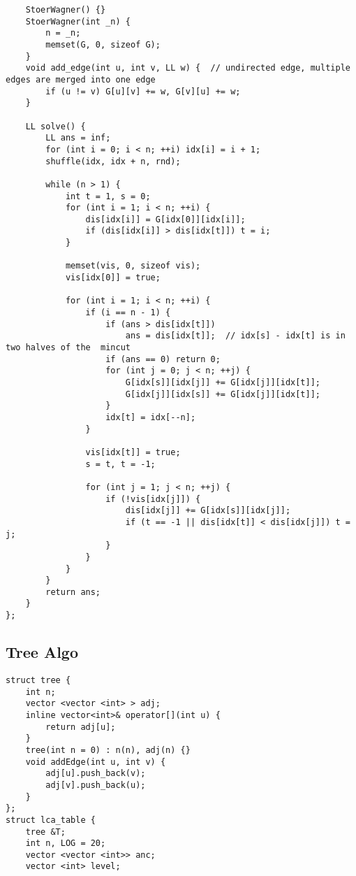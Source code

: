 \documentclass[FSZ,a4paper,onesided]{article}
\begin{document}
\begin{multicols*}{\COLS}
\begin{lstlisting}
    StoerWagner() {}
    StoerWagner(int _n) {
        n = _n;
        memset(G, 0, sizeof G);
    }
    void add_edge(int u, int v, LL w) {  // undirected edge, multiple edges are merged into one edge
        if (u != v) G[u][v] += w, G[v][u] += w;
    }

    LL solve() {
        LL ans = inf;
        for (int i = 0; i < n; ++i) idx[i] = i + 1;
        shuffle(idx, idx + n, rnd);

        while (n > 1) {
            int t = 1, s = 0;
            for (int i = 1; i < n; ++i) {
                dis[idx[i]] = G[idx[0]][idx[i]];
                if (dis[idx[i]] > dis[idx[t]]) t = i;
            }

            memset(vis, 0, sizeof vis);
            vis[idx[0]] = true;

            for (int i = 1; i < n; ++i) {
                if (i == n - 1) {
                    if (ans > dis[idx[t]])
                        ans = dis[idx[t]];  // idx[s] - idx[t] is in two halves of the  mincut
                    if (ans == 0) return 0;
                    for (int j = 0; j < n; ++j) {
                        G[idx[s]][idx[j]] += G[idx[j]][idx[t]];
                        G[idx[j]][idx[s]] += G[idx[j]][idx[t]];
                    }
                    idx[t] = idx[--n];
                }

                vis[idx[t]] = true;
                s = t, t = -1;

                for (int j = 1; j < n; ++j) {
                    if (!vis[idx[j]]) {
                        dis[idx[j]] += G[idx[s]][idx[j]];
                        if (t == -1 || dis[idx[t]] < dis[idx[j]]) t = j;
                    }
                }
            }
        }
        return ans;
    }
};\end{lstlisting}
\subsection{Tree Algo}
\begin{lstlisting}
struct tree {
    int n;
    vector <vector <int> > adj;
    inline vector<int>& operator[](int u) {
        return adj[u];
    }
    tree(int n = 0) : n(n), adj(n) {}
    void addEdge(int u, int v) {
        adj[u].push_back(v);
        adj[v].push_back(u);
    }
};
struct lca_table {
    tree &T;
    int n, LOG = 20;
    vector <vector <int>> anc;
    vector <int> level;


\end{lstlisting}
\end{multicols*}
\end{document}
